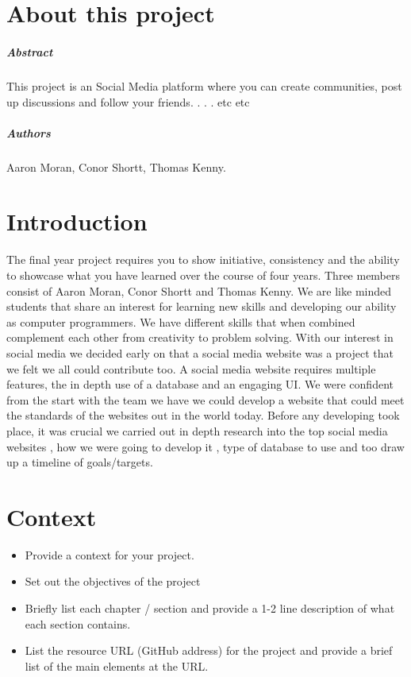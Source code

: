 
\chapter*{About this project}
\paragraph{Abstract}
This project is an Social Media platform where you can create communities, post up discussions and follow your friends. . . .  etc etc

\paragraph{Authors}
Aaron Moran, Conor Shortt, Thomas Kenny.



\chapter{Introduction}
The final year project requires you to show initiative, consistency and the ability to showcase what you have learned over the course of four years.
Three members consist of Aaron Moran, Conor Shortt and Thomas Kenny. We are like minded students that share an interest for learning new skills and developing our ability as computer programmers. We have different skills that when combined complement each other from creativity to problem solving. With our interest in social media we decided early on that a social media website was a project that we felt we all could contribute too. A social media website requires multiple features, the in depth use of a database and an engaging UI. We were confident from the start with the team we have we could develop a website that could meet the standards of the websites out in the world today.
Before any developing took place, it was crucial we carried out in depth research into the top social media websites , how we were going to develop it , type of database to use and too draw up a timeline of goals/targets.



\newpage


\chapter{Context}
\begin{itemize}
\item Provide a context for your project.

\item Set out the objectives of the project
\item Briefly list each chapter / section and provide a 1-2 line description of what each section contains.
\item List the resource URL (GitHub address) for the project and provide a brief list of the main elements at the URL.
\end{itemize}

